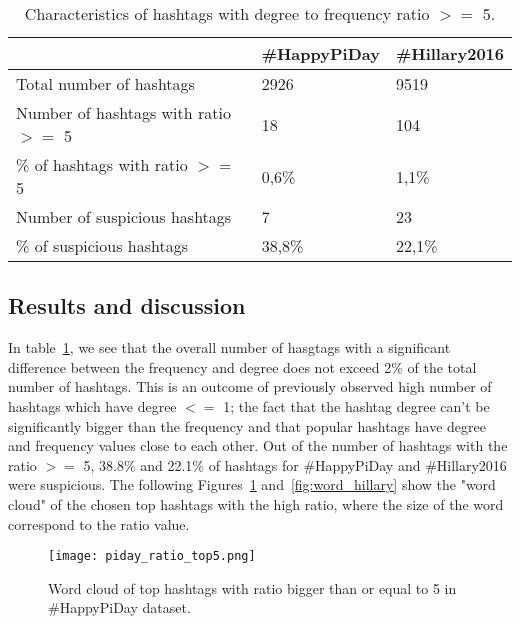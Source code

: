 \documentclass[journal, a4paper, 12pt]{article}
\begin{document}
  \begin{table}[!hbt]
		\begin{center}
		\caption{Characteristics of hashtags with degree to frequency ratio $>=$ 5.}
		\label{tab:hashtagratio}
		\begin{tabular}{|p{5cm}|p{3cm}|p{3cm}|}
			\hline
			 & \#HappyPiDay & \#Hillary2016 \\
            \hline
			Total number of hashtags & 2926 & 9519 \\
			\hline
			Number of hashtags with ratio $>=$ 5 & 18  &  104 \\
			\hline
			\% of hashtags with ratio $>=$ 5 & 0,6\% & 1,1\%\\
            \hline
            Number of suspicious hashtags & 7 & 23 \\
			\hline
            \% of suspicious hashtags & 38,8\% & 22,1\%\\
			\hline
		\end{tabular}
		\end{center}
	\end{table}

\subsection{Results and discussion}
In table~\ref{tab:hashtagratio}, we see that the overall number of hasgtags with a significant difference between the frequency and degree does not exceed 2\% of the total number of hashtags. This is an outcome of previously observed high number of hashtags which have degree $<=$ 1; the fact that the hashtag degree can't be significantly bigger than the frequency and that popular hashtags have degree and frequency values close to each other. Out of the number of hashtags with the ratio $>=$ 5, 38.8\%  and 22.1\% of hashtags for \#HappyPiDay and \#Hillary2016 were suspicious. The following Figures~\ref{fig:word_piday} and~\ref{fig:word_hillary} show the "word cloud" of the chosen top hashtags with the high ratio, where the size of the word correspond to the ratio value.
\\
        
     \begin{figure}[!hbt]
		\begin{center}
		\texttt{[image: piday\_ratio\_top5.png]}
		\caption{Word cloud of top hashtags with ratio bigger than or equal to 5 in \#HappyPiDay dataset.}
		\label{fig:word_piday}
		\end{center}
	\end{figure}
    
\end{document}
